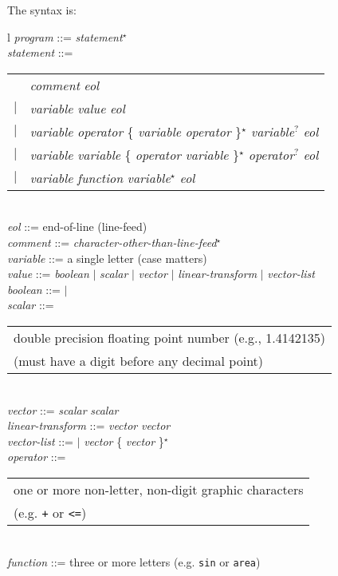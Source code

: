 \documentclass[12pt]{article}
\begin{document}
The syntax is:
\\[1ex]
\hspace*{0.2in}\begin{tabular}{l}
{\em program} ::= {\em statement}$^\star$ \\
{\em statement} ::= \\
\hspace*{0.2in}\begin{tabular}[t]{cl}
                    & {\em comment} {\em eol} \\
                $|$ & {\em variable} \TT{=} {\em value} {\em eol}\\
                $|$ & {\em variable} \TT{=} {\em operator}
		          \{ {\em variable} {\em operator} \}$^\star$
		          {\em variable}$^?$ {\em eol} \\
                $|$ & {\em variable} \TT{=} {\em variable}
		          \{ {\em operator} {\em variable} \}$^\star$
		          {\em operator}$^?$ {\em eol} \\
                $|$ & {\em variable} \TT{=} {\em function}
		          {\em variable}$^\star$ {\em eol} \\
		\end{tabular}
\\[1ex]
{\em eol} ::= end-of-line (line-feed) \\
{\em comment} ::= \TT{\#} {\em character-other-than-line-feed}$^\star$ \\
{\em variable} ::= a single letter (case matters) \\
{\em value} ::= {\em boolean} $|$ {\em scalar} $|$ {\em vector}
	    $|$ {\em linear-transform} $|$ {\em vector-list} \\
{\em boolean} ::=  $|$  \\
{\em scalar} ::= \begin{tabular}[t]{@{}l}
                 double precision floating point number (e.g., 1.4142135) \\
		 (must have a digit before any decimal point) \\
		 \end{tabular} \\
{\em vector} ::= \TT{(} {\em scalar}\TT{,} {\em scalar} \TT{)} \\
{\em linear-transform} ::= \TT{[} {\em vector}\TT{,} {\em vector} \TT{]} \\
{\em vector-list} ::= \TT{()} $|$
                 \TT{(} {\em vector} \{ \TT{,} {\em vector} \}$^\star$ \TT{)} \\
{\em operator} ::= \begin{tabular}[t]{@{}l}
                   one or more non-letter, non-digit graphic characters \\
                   (e.g. {\tt +} or {\tt <=})\\
		   \end{tabular} \\
{\em function} ::= three or more letters (e.g. {\tt sin} or {\tt area})
\end{tabular}
\end{document}
